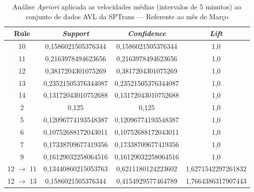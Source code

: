 \documentclass[
	12pt,				%
	oneside,			%
	a4paper,			%
	english,			%
	brazil				%
	]{abntex2ppgsi}
\begin{document}
{{\begin{apendicesenv}
\begin{table}[!htb]
\centering
\caption {Análise \textit{Apriori} aplicada as velocidades médias (intervalos de 5 minutos) ao conjunto de dados AVL da SPTrans --- Referente ao mês de Março}
\label {tab:aprioriMarch}
\begin{tabular}{c|c|c|c}
\hline
\textbf{Rule} & \textit{\textbf{Support}} & \textit{\textbf{Confidence}} & \textit{\textbf{Lift}} \\
\hline 
10 &  0,1586021505376344 &  0,1586021505376344 &  1,0\\ 
\hline 
11 &  0,2163978494623656 &  0,2163978494623656 &  1,0\\ 
\hline 
12 &  0,3817204301075269 &  0,3817204301075269 &  1,0\\ 
\hline 
13 &  0,23521505376344087 &  0,23521505376344087 &  1,0\\ 
\hline 
14 &  0,13172043010752688 &  0,13172043010752688 &  1,0\\ 
\hline 
2 &  0,125 &  0,125 &  1,0\\ 
\hline 
5 &  0,12096774193548387 &  0,12096774193548387 &  1,0\\ 
\hline 
6 &  0,10752688172043011 &  0,10752688172043011 &  1,0\\ 
\hline 
7 &  0,17338709677419356 &  0,17338709677419356 &  1,0\\ 
\hline 
9 &  0,16129032258064516 &  0,16129032258064516 &  1,0\\ 
\hline 
12 $\rightarrow$ 11 &  0,13440860215053763 &  0,6211180124223602 &  1,6271542297261832\\ 
\hline 
12 $\rightarrow$ 13 &  0,1586021505376344 &  0,4154929577464789 &  1,7664386317907443\\
\hline
\end{tabular}
\end{table}



\end{apendicesenv}}}
\end{document}
